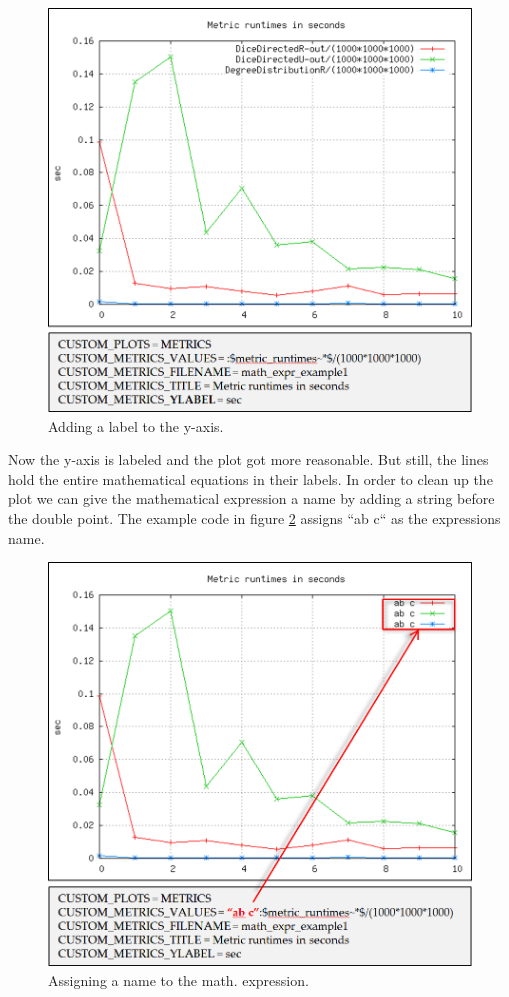 \begin{figure} [h]
\centering
\includegraphics [scale=0.5] {images/38}
\caption{Adding a label to the y-axis.}
\label{fig:38}
\end{figure}

Now the y-axis is labeled and the plot got more reasonable. But still, the lines hold the entire mathematical equations in their labels. In order to clean up the plot we can give the mathematical expression a name by adding a string before the double point. The example code in figure \ref{fig:39} assigns “ab c“ as the expressions name.

\begin{figure} [h]
\centering
\includegraphics [scale=0.5] {images/39}
\caption{Assigning a name to the math. expression.}
\label{fig:39}
\end{figure}

